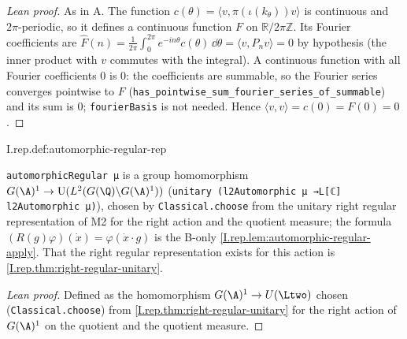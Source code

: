 \begin{proof}[Lean proof]
As in A. The function $c(\theta)=\langle v,\pi(\iota(k_\theta))v\rangle$ is continuous and $2\pi$-periodic, so it defines a continuous function $F$ on $\mathbb R/2\pi\mathbb Z$. Its Fourier coefficients are $\hat F(n)=\frac1{2\pi}\int_0^{2\pi}e^{-in\theta}c(\theta)\,\dd\theta=\langle v,P_nv\rangle=0$ by hypothesis (the inner product with $v$ commutes with the integral). A continuous function with all Fourier coefficients $0$ is $0$: the coefficients are summable, so the Fourier series converges pointwise to $F$ (\texttt{has\_pointwise\_sum\_fourier\_series\_of\_summable}) and its sum is $0$; \texttt{fourierBasis} is not needed. Hence $\langle v,v\rangle=c(0)=F(0)=0$.
\end{proof}

\begin{definition}
\end{definition}
\begin{tfformal}{I.rep.def:automorphic-regular-rep}
\begin{tffidelity}
\texttt{automorphicRegular μ} is a group homomorphism $G(\A)^1\to\mathrm U(L^2(G(\Q)\backslash G(\A)^1))$ (\texttt{unitary (l2Automorphic μ →L[ℂ] l2Automorphic μ)}), chosen by \texttt{Classical.choose} from the unitary right regular representation of M2 for the right action and the quotient measure; the formula $(R(g)\varphi)(\dot x)=\varphi(\dot x\cdot g)$ is the B-only \cref{I.rep.lem:automorphic-regular-apply}. That the right regular representation exists for this action is \cref{I.rep.thm:right-regular-unitary}.
\end{tffidelity}
\end{tfformal}
\begin{proof}[Lean proof]
Defined as the homomorphism $G(\A)^1\to U(\Ltwo)$ chosen (\texttt{Classical.choose}) from \cref{I.rep.thm:right-regular-unitary} for the right action of $G(\A)^1$ on the quotient and the quotient measure.
\end{proof}

